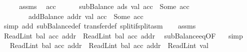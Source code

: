 \begin{isabellebody}
%
\isadelimproof
%
\endisadelimproof
%
\isatagproof
{}\isamarkupfalse%
\ {\isacharminus}{\kern0pt}\isanewline
\ \ \isamarkupfalse%
\ assms{\isacharparenleft}{\kern0pt}{}{\isacharparenright}{\kern0pt}\ \isamarkupfalse%
\ acc{\isacharprime}{\kern0pt}{\isacharprime}{\kern0pt}\isanewline
\ \ \ \ \ {\isacharasterisk}{\kern0pt}{\isacharcolon}{\kern0pt}\ {\isachardoublequoteopen}subBalance\ ads\ val\ acc\ {\isacharequal}{\kern0pt}\ Some\ acc{\isacharprime}{\kern0pt}{\isacharprime}{\kern0pt}{\isachardoublequoteclose}\isanewline
\ \ \ \ \ \ \ {\isacharasterisk}{\kern0pt}{\isacharasterisk}{\kern0pt}{\isacharcolon}{\kern0pt}\ {\isachardoublequoteopen}addBalance\ addr\ val\ acc{\isacharprime}{\kern0pt}{\isacharprime}{\kern0pt}\ {\isacharequal}{\kern0pt}\ Some\ acc{\isacharprime}{\kern0pt}{\isachardoublequoteclose}\ \isamarkupfalse%
\ {\isacharparenleft}{\kern0pt}simp\ add{\isacharcolon}{\kern0pt}\ subBalance{\isacharunderscore}{\kern0pt}def\ transfer{\isacharunderscore}{\kern0pt}def\ split{\isacharcolon}{\kern0pt}if{\isacharunderscore}{\kern0pt}split{\isacharunderscore}{\kern0pt}asm{\isacharparenright}{\kern0pt}\isanewline
\isanewline
\ \ \isamarkupfalse%
\ assms{\isacharparenleft}{\kern0pt}{}{\isacharparenright}{\kern0pt}\ \isamarkupfalse%
\ {\isachardoublequoteopen}ReadL\isactrlsub i\isactrlsub n\isactrlsub t\ {\isacharparenleft}{\kern0pt}bal\ {\isacharparenleft}{\kern0pt}acc\ addr{\isacharparenright}{\kern0pt}{\isacharparenright}{\kern0pt}\ {\isacharequal}{\kern0pt}\ ReadL\isactrlsub i\isactrlsub n\isactrlsub t\ {\isacharparenleft}{\kern0pt}bal\ {\isacharparenleft}{\kern0pt}acc{\isacharprime}{\kern0pt}{\isacharprime}{\kern0pt}\ addr{\isacharparenright}{\kern0pt}{\isacharparenright}{\kern0pt}{\isachardoublequoteclose}\ \isamarkupfalse%
\ subBalance{\isacharunderscore}{\kern0pt}eq{\isacharbrackleft}{\kern0pt}OF\ {\isacharasterisk}{\kern0pt}{\isacharbrackright}{\kern0pt}\ \isamarkupfalse%
\ simp\isanewline
\ \ \isamarkupfalse%
\ \isamarkupfalse%
\ {\isachardoublequoteopen}ReadL\isactrlsub i\isactrlsub n\isactrlsub t\ {\isacharparenleft}{\kern0pt}bal\ {\isacharparenleft}{\kern0pt}acc{\isacharprime}{\kern0pt}\ addr{\isacharparenright}{\kern0pt}{\isacharparenright}{\kern0pt}\ {\isacharequal}{\kern0pt}\ ReadL\isactrlsub i\isactrlsub n\isactrlsub t\ {\isacharparenleft}{\kern0pt}bal\ {\isacharparenleft}{\kern0pt}acc{\isacharprime}{\kern0pt}{\isacharprime}{\kern0pt}\ addr{\isacharparenright}{\kern0pt}{\isacharparenright}{\kern0pt}\ {\isacharplus}{\kern0pt}\ ReadL\isactrlsub i\isactrlsub n\isactrlsub t\ val{\isachardoublequoteclose}\ \isamarkupfalse%

\end{isabellebody}
